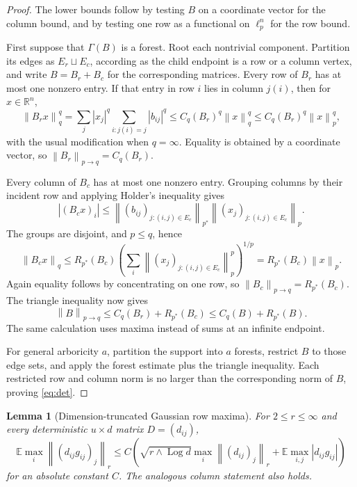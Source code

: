 \documentclass[11pt]{article}
\newtheorem{lemma}[theorem]{Lemma}
\theoremstyle{definition}
\theoremstyle{remark}
\newcommand{\E}{\mathbb E}
\newcommand{\R}{\mathbb R}
\newcommand{\Log}{\operatorname{Log}}
\newcommand{\opnorm}[1]{\left\lVert #1\right\rVert}
\begin{document}
\begin{proof}
The lower bounds follow by testing $B$ on a coordinate vector for the column
bound, and by testing one row as a functional on $\ell_p^n$ for the row bound.

First suppose that $\Gamma(B)$ is a forest.  Root each nontrivial component.
Partition its edges as $E_r\sqcup E_c$, according as the child endpoint is a
row or a column vertex, and write $B=B_r+B_c$ for the corresponding matrices.
Every row of $B_r$ has at most one nonzero entry.  If that entry in row $i$ lies
in column $j(i)$, then for $x\in\R^n$,
\[
 \opnorm{B_rx}_q^q
 =\sum_j |x_j|^q\sum_{i:j(i)=j}|b_{ij}|^q
 \le C_q(B_r)^q\opnorm{x}_q^q
 \le C_q(B_r)^q\opnorm{x}_p^q,
\]
with the usual modification when $q=\infty$.  Equality is obtained by a
coordinate vector, so $\opnorm{B_r}_{p\to q}=C_q(B_r)$.

Every column of $B_c$ has at most one nonzero entry.  Grouping columns by their
incident row and applying Holder's inequality gives
\[
 |(B_cx)_i|\le \opnorm{(b_{ij})_{j:(i,j)\in E_c}}_{p^*}
 \opnorm{(x_j)_{j:(i,j)\in E_c}}_p.
\]
The groups are disjoint, and $p\le q$, hence
\[
 \opnorm{B_cx}_q\le R_{p^*}(B_c)
 \left(\sum_i\opnorm{(x_j)_{j:(i,j)\in E_c}}_p^p\right)^{1/p}
 =R_{p^*}(B_c)\opnorm{x}_p.
\]
Again equality follows by concentrating on one row, so
$\opnorm{B_c}_{p\to q}=R_{p^*}(B_c)$.  The triangle inequality now gives
\[
 \opnorm{B}_{p\to q}
 \le C_q(B_r)+R_{p^*}(B_c)
 \le C_q(B)+R_{p^*}(B).
\]
The same calculation uses maxima instead of sums at an infinite endpoint.

For general arboricity $a$, partition the support into $a$ forests, restrict
$B$ to those edge sets, and apply the forest estimate plus the triangle
inequality.  Each restricted row and column norm is no larger than the
corresponding norm of $B$, proving \eqref{eq:det}.
\end{proof}

\begin{lemma}[Dimension-truncated Gaussian row maxima]\label{lem:gaussmax}
For $2\le r\le\infty$ and every deterministic $u\times d$ matrix $D=(d_{ij})$,
\begin{equation}\label{eq:gaussmax}
 \E\max_i\opnorm{(d_{ij}g_{ij})_j}_r
 \le C\left(
 \sqrt{r\wedge\Log d}\max_i\opnorm{(d_{ij})_j}_r
 +\E\max_{i,j}|d_{ij}g_{ij}|
 \right)
\end{equation}
for an absolute constant $C$.  The analogous column statement also holds.
\end{lemma}
\end{document}

